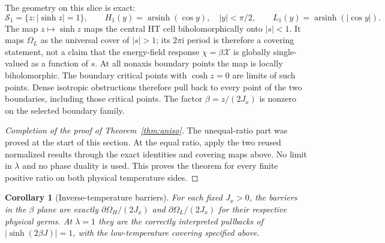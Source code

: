 \documentclass[11pt]{article}
\numberwithin{equation}{section}
\newtheorem{corollary}[theorem]{Corollary}
\theoremstyle{definition}
\newcommand{\ii}{\mathrm i}
\newcommand{\cS}{\mathcal S}
\newcommand{\OH}{\Omega_H}
\newcommand{\OL}{\Omega_L}
\begin{document}
The geometry on this slice is exact:
\[
 \cS_1=\{z:|\sinh z|=1\},\qquad
 H_1(y)=\operatorname{arsinh}(\cos y),\quad |y|<\pi/2,
 \qquad L_1(y)=\operatorname{arsinh}(|\cos y|).
\]
The map $z\mapsto\sinh z$ maps the central HT cell biholomorphically
onto $|s|<1$. It maps $\OL$ as the universal cover of $|s|>1$;
its $2\pi\ii$ period is therefore a covering statement, not a claim
that the energy-field response $\chi=\beta\mathcal X$ is globally
single-valued as a function of $s$. At all nonaxis boundary points the
map is locally biholomorphic. The boundary critical points with
$\cosh z=0$ are limits of such points. Dense isotropic obstructions
therefore pull back to every point of the two boundaries, including
those critical points. The factor $\beta=z/(2J_x)$ is nonzero on the
selected boundary family.

\begin{proof}[Completion of the proof of Theorem~\ref{thm:aniso}]
The unequal-ratio part was proved at the start of this section. At the equal ratio,
apply the two reused normalized results through the exact identities
and covering maps above. No limit in $\lambda$ and no phase duality
is used. This proves the theorem for every finite positive ratio on
both physical temperature sides.
\end{proof}

\begin{corollary}[Inverse-temperature barriers]\label{cor:alllambda}
For each fixed $J_x>0$, the barriers in the $\beta$ plane are exactly
$\partial\OH/(2J_x)$ and $\partial\OL/(2J_x)$ for their respective
physical germs. At $\lambda=1$ they are the correctly interpreted
pullbacks of $|\sinh(2\beta J)|=1$, with the low-temperature covering
specified above.
\end{corollary}
\end{document}
